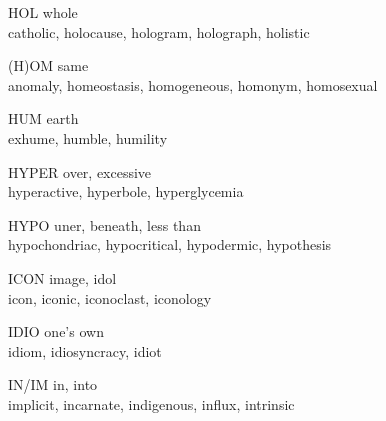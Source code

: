 \begin{flashcard}[Roots]{HOL}
whole\\
\vspace{0.2in}
catholic, holocause, hologram, holograph, holistic\\
\end{flashcard}

\begin{flashcard}[Roots]{(H)OM}
same\\
\vspace{0.2in}
anomaly, homeostasis, homogeneous, homonym, homosexual\\
\end{flashcard}

\begin{flashcard}[Roots]{HUM}
earth\\
\vspace{0.2in}
exhume, humble, humility\\
\end{flashcard}

\begin{flashcard}[Roots]{HYPER}
over, excessive\\
\vspace{0.2in}
hyperactive, hyperbole, hyperglycemia\\
\end{flashcard}

\begin{flashcard}[Roots]{HYPO}
uner, beneath, less than\\
\vspace{0.2in}
hypochondriac, hypocritical, hypodermic, hypothesis\\
\end{flashcard}

\begin{flashcard}[Roots]{ICON}
image, idol\\
\vspace{0.2in}
icon, iconic, iconoclast, iconology\\
\end{flashcard}

\begin{flashcard}[Roots]{IDIO}
one's own\\
\vspace{0.2in}
idiom, idiosyncracy, idiot\\
\end{flashcard}

\begin{flashcard}[Roots]{IN/IM}
in, into\\
\vspace{0.2in}
implicit, incarnate, indigenous, influx, intrinsic\\
\end{flashcard}

